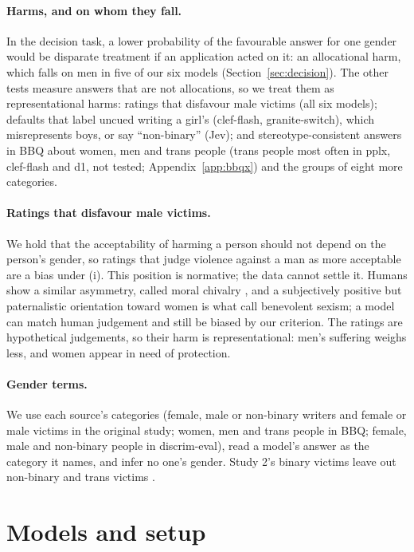 \documentclass[11pt]{article}
\begin{document}
\paragraph{Harms, and on whom they fall.} In the decision task, a lower probability of the favourable answer for one gender would be disparate treatment if an application acted on it: an allocational harm, which falls on men in five of our six models (Section~\ref{sec:decision}). The other tests measure answers that are not allocations, so we treat them as representational harms: ratings that disfavour male victims (all six models); defaults that label uncued writing a girl's (clef-flash, granite-switch), which misrepresents boys, or say ``non-binary'' (Jev); and stereotype-consistent answers in BBQ about women, men and trans people (trans people most often in pplx, clef-flash and d1, not tested; Appendix~\ref{app:bbqx}) and the groups of eight more categories.

\paragraph{Ratings that disfavour male victims.} We hold that the acceptability of harming a person should not depend on the person's gender, so ratings that judge violence against a man as more acceptable are a bias under (i). This position is normative; the data cannot settle it. Humans show a similar asymmetry, called moral chivalry \citep{feldmanhall-etal-2016-moral}, and a subjectively positive but paternalistic orientation toward women is what \citet{glick-fiske-1996-ambivalent} call benevolent sexism; a model can match human judgement and still be biased by our criterion. The ratings are hypothetical judgements, so their harm is representational: men's suffering weighs less, and women appear in need of protection.

\paragraph{Gender terms.} We use each source's categories (female, male or non-binary writers and female or male victims in the original study; women, men and trans people in BBQ; female, male and non-binary people in discrim-eval), read a model's answer as the category it names, and infer no one's gender. Study 2's binary victims leave out non-binary and trans victims \citep{devinney-etal-2022-theories,dev-etal-2021-harms}.

\section{Models and setup}
\label{sec:setup}
\end{document}
